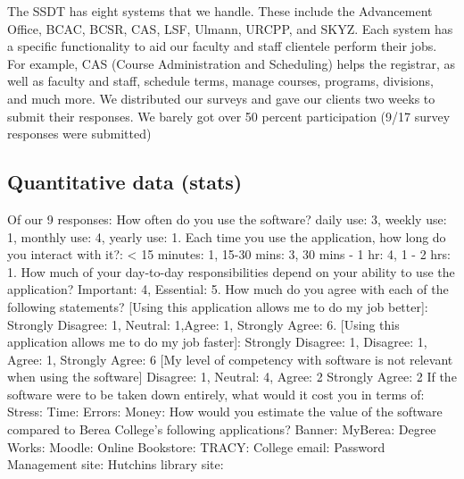 The SSDT has eight systems that we handle. These include the Advancement Office, BCAC, BCSR, CAS, LSF, Ulmann, URCPP, and SKYZ. Each system has a specific functionality to aid our faculty and staff clientele perform their jobs. For example, CAS (Course Administration and Scheduling) helps the registrar, as well as faculty and staff, schedule terms, manage courses, programs, divisions, and much more.
We distributed our surveys and gave our clients two weeks to submit their responses. We barely got over 50 percent participation (9/17 survey responses were submitted)


\subsection{Quantitative data (stats)}
Of our 9 responses: %
How often do you use the software? daily use: 3, weekly use: 1, monthly use: 4, yearly use: 1.
Each time you use the  application, how long do you interact with it?: < 15 minutes: 1, 15-30 mins: 3, 30 mins - 1 hr: 4, 1 - 2 hrs: 1.
How much of your day-to-day responsibilities depend on your ability to use the  application? Important: 4, Essential: 5.
How much do you agree with each of the following statements?
[Using this application allows me to do my job better]: Strongly Disagree: 1, Neutral: 1,Agree: 1, Strongly Agree: 6.
[Using this application allows me to do my job faster]: Strongly Disagree: 1, Disagree: 1, Agree: 1, Strongly Agree: 6
[My level of competency with software is not relevant when using the software] Disagree: 1, Neutral: 4, Agree: 2 Strongly Agree: 2
If the software were to be taken down entirely, what would it cost you in terms of:
Stress:
Time:
Errors:
Money:
How would you estimate the value of the software compared to Berea College's following applications?
Banner:
MyBerea:
Degree Works:
Moodle:
Online Bookstore:
TRACY:
College email:
Password Management site:
Hutchins library site:
